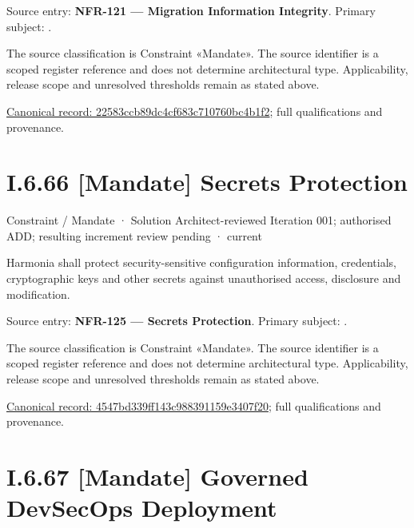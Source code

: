 Source entry: \textbf{NFR-121 — Migration Information Integrity}. Primary subject: \texttt{}.



The source classification is Constraint «Mandate». The source identifier is a scoped register reference and does not determine architectural type. Applicability, release scope and unresolved thresholds remain as stated above.


{\footnotesize \href{../../../../continuum/motivation/constraint/mandate/22583ccb89dc4cf683c710760bc4b1f2.md}{Canonical record: 22583ccb89dc4cf683c710760bc4b1f2}; full qualifications and provenance.}\par
\section*{I.6.66 [Mandate] Secrets Protection}
\label{navigation:I.6.66}

\label{element:4547bd339ff143c988391159e3407f20}
{\small Constraint / Mandate · Solution Architect-reviewed Iteration 001; authorised ADD; resulting increment review pending · current}\par

Harmonia shall protect security-sensitive configuration information, credentials, cryptographic keys and other secrets against unauthorised access, disclosure and modification.



Source entry: \textbf{NFR-125 — Secrets Protection}. Primary subject: \texttt{}.



The source classification is Constraint «Mandate». The source identifier is a scoped register reference and does not determine architectural type. Applicability, release scope and unresolved thresholds remain as stated above.


{\footnotesize \href{../../../../continuum/motivation/constraint/mandate/4547bd339ff143c988391159e3407f20.md}{Canonical record: 4547bd339ff143c988391159e3407f20}; full qualifications and provenance.}\par
\section*{I.6.67 [Mandate] Governed DevSecOps Deployment}
\label{navigation:I.6.67}

